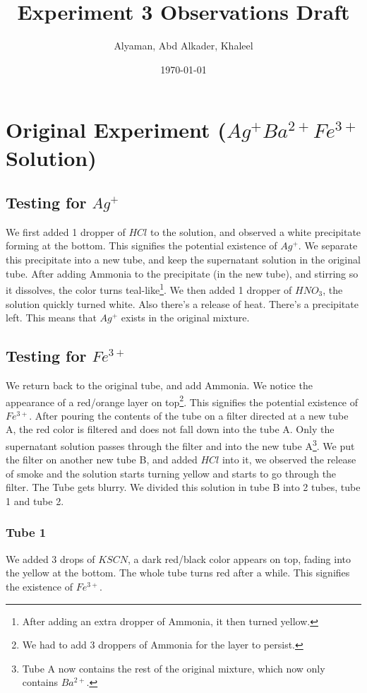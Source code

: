 \documentclass[11pt]{article}
\author{Alyaman, Abd Alkader, Khaleel}
\date{\today}
\title{Experiment 3 Observations Draft}
\begin{document}
\maketitle
\tableofcontents


\section{Original Experiment (\(Ag^+ Ba^{2+} Fe^{3+}\) Solution)}
\label{sec:org98f0e8f}
\subsection{Testing for \(Ag^+\)}
\label{sec:org412e963}
We first added 1 dropper of \(HCl\) to the solution, and observed a white precipitate forming at the bottom. This signifies the potential existence of \(Ag^+\).
We separate this precipitate into a new tube, and keep the supernatant solution in the original tube.
After adding Ammonia to the precipitate (in the new tube), and stirring so it dissolves, the color turns teal-like\footnote{After adding an extra dropper of Ammonia, it then turned yellow.}.
We then added 1 dropper of \(HNO_3\), the solution quickly turned white. Also there's a release of heat. There's a precipitate left.
This means that \(Ag^+\) exists in the original mixture.
\subsection{Testing for \(Fe^{3+}\)}
\label{sec:orga95bc3e}
We return back to the original tube, and add Ammonia. We notice the appearance of a red/orange layer on top\footnote{We had to add 3 droppers of Ammonia for the layer to persist.}. This signifies the potential existence of \(Fe^{3+}\).
After pouring the contents of the tube on a filter directed at a new tube A, the red color is filtered and does not fall down into the tube A. Only the supernatant solution passes through the filter and into the new tube A\footnote{Tube A now contains the rest of the original mixture, which now only contains \(Ba^{2+}\).}.
We put the filter on another new tube B, and added \(HCl\) into it, we observed the release of smoke and the solution starts turning yellow and starts to go through the filter. The Tube gets blurry.
We divided this solution in tube B into 2 tubes, tube 1 and tube 2.
\subsubsection{Tube 1}
\label{sec:org5e37295}
We added 3 drops of \(KSCN\), a dark red/black color appears on top, fading into the yellow at the bottom. The whole tube turns red after a while. This signifies the existence of \(Fe^{3+}\).
\end{document}
